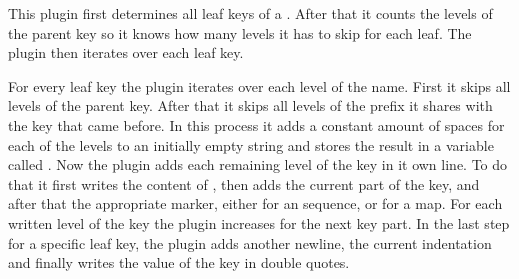 This plugin first determines all leaf keys of a . After that it counts the levels of the parent key so it knows how many levels it has to skip for each leaf. The plugin then iterates over each leaf key.

For every leaf key the plugin iterates over each level of the name. First it skips all levels of the parent key. After that it skips all levels of the prefix it shares with the key that came before. In this process it adds a constant amount of spaces for each of the levels to an initially empty string and stores the result in a variable called . Now the plugin adds each remaining level of the key in it own line. To do that it first writes the content of , then adds the current part of the key, and after that the appropriate marker, either \yaml{-} for an sequence, or \yaml{:} for a map. For each written level of the key the plugin increases  for the next key part. In the last step for a specific leaf key, the plugin adds another newline, the current indentation and finally writes the value of the key in double quotes.
